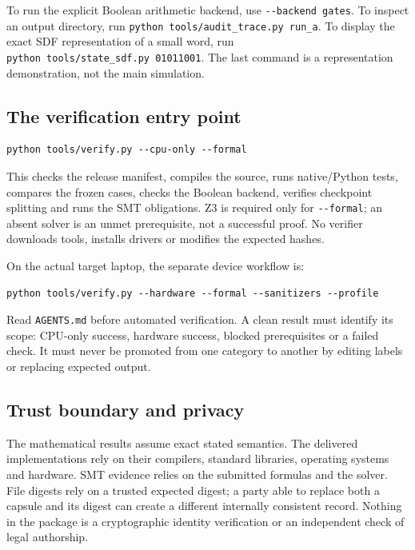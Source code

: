 \documentclass[11pt,a4paper]{article}
\begin{document}
To run the explicit Boolean arithmetic backend, use
\texttt{-\/-backend\ gates}. To inspect an output directory, run
\texttt{python\ tools/audit\_trace.py\ run\_a}. To display the exact SDF
representation of a small word, run
\texttt{python\ tools/state\_sdf.py\ 01011001}. The last command is a
representation demonstration, not the main simulation.

\subsection{The verification entry
point}\label{the-verification-entry-point}

\begin{verbatim}
python tools/verify.py --cpu-only --formal
\end{verbatim}

This checks the release manifest, compiles the source, runs
native/Python tests, compares the frozen cases, checks the Boolean
backend, verifies checkpoint splitting and runs the SMT obligations. Z3
is required only for \texttt{-\/-formal}; an absent solver is an unmet
prerequisite, not a successful proof. No verifier downloads tools,
installs drivers or modifies the expected hashes.

On the actual target laptop, the separate device workflow is:

\begin{verbatim}
python tools/verify.py --hardware --formal --sanitizers --profile
\end{verbatim}

Read \texttt{AGENTS.md} before automated verification. A clean result
must identify its scope: CPU-only success, hardware success, blocked
prerequisites or a failed check. It must never be promoted from one
category to another by editing labels or replacing expected output.

\subsection{Trust boundary and
privacy}\label{trust-boundary-and-privacy}

The mathematical results assume exact stated semantics. The delivered
implementations rely on their compilers, standard libraries, operating
systems and hardware. SMT evidence relies on the submitted formulas and
the solver. File digests rely on a trusted expected digest; a party able
to replace both a capsule and its digest can create a different
internally consistent record. Nothing in the package is a cryptographic
identity verification or an independent check of legal authorship.
\end{document}
